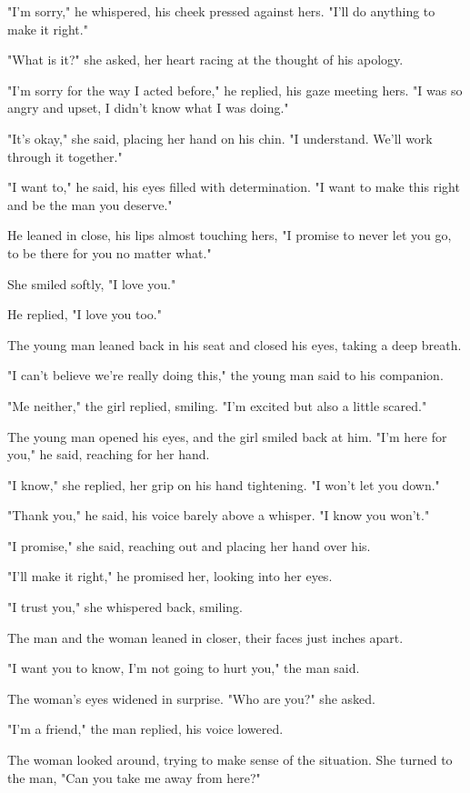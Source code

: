 \documentclass[smalldemyvopaper,11pt,twoside,onecolumn,openright,extrafontsizes]{memoir}
\begin{document}
"I'm sorry," he whispered, his cheek pressed against hers. "I'll do anything to make it right."\par
"What is it?" she asked, her heart racing at the thought of his apology.\par
"I'm sorry for the way I acted before," he replied, his gaze meeting hers. "I was so angry and upset, I didn't know what I was doing."\par
"It's okay," she said, placing her hand on his chin. "I understand. We'll work through it together."\par
"I want to," he said, his eyes filled with determination. "I want to make this right and be the man you deserve."\par
He leaned in close, his lips almost touching hers, "I promise to never let you go, to be there for you no matter what."\par
She smiled softly, "I love you."\par
He replied, "I love you too."\par
The young man leaned back in his seat and closed his eyes, taking a deep breath.\par
"I can't believe we're really doing this," the young man said to his companion.\par
"Me neither," the girl replied, smiling. "I'm excited but also a little scared."\par
The young man opened his eyes, and the girl smiled back at him. "I'm here for you," he said, reaching for her hand.\par
"I know," she replied, her grip on his hand tightening. "I won't let you down."\par
"Thank you," he said, his voice barely above a whisper. "I know you won't."\par
"I promise," she said, reaching out and placing her hand over his.\par
"I'll make it right," he promised her, looking into her eyes.\par
"I trust you," she whispered back, smiling.\par
The man and the woman leaned in closer, their faces just inches apart.\par
"I want you to know, I'm not going to hurt you," the man said.\par
The woman's eyes widened in surprise. "Who are you?" she asked.\par
"I'm a friend," the man replied, his voice lowered.\par
The woman looked around, trying to make sense of the situation. She turned to the man, "Can you take me away from here?"\par
\end{document}
